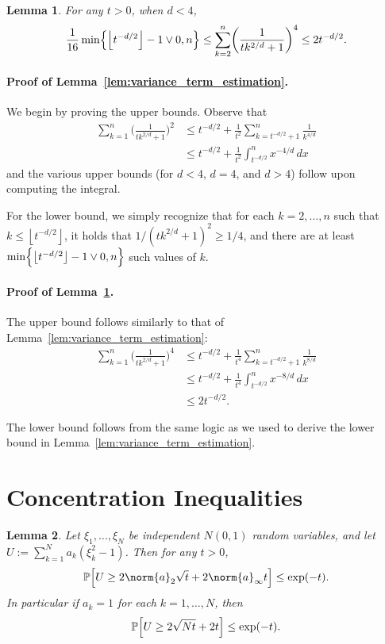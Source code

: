 \documentclass[twoside]{article}
\newcommand{\floor}[1]{\left\lfloor #1 \right\rfloor}
\newcommand{\1}{\mathbf{1}}
\newcommand{\Pbb}{\mathbb{P}}
\newtheorem{lemma}{Lemma}
\theoremstyle{definition}
\theoremstyle{remark}
\begin{document}
\begin{lemma}
	\label{lem:variance_term_testing}
	For any $t > 0$, when $d < 4$,
	\begin{equation*}
	\frac{1}{16}\min\Bigl\{\floor{t^{-d/2}} - 1 \vee 0,n\Bigr\} \leq \sum_{k = 2}^{n} \biggl(\frac{1}{tk^{2/d} + 1}\biggr)^4 \leq 2t^{-d/2}.
	\end{equation*}
\end{lemma}
\paragraph{Proof of Lemma~\ref{lem:variance_term_estimation}.}
We begin by proving the upper bounds. Observe that
\begin{align*}
 \sum_{k = 1}^{n} \biggl(\frac{1}{tk^{2/d} + 1}\biggr)^2 & \leq t^{-d/2} + \frac{1}{t^2}\sum_{k = t^{-d/2} + 1}^{n} \frac{1}{k^{4/d}} \\
 & \leq t^{-d/2} + \frac{1}{t^2} \int_{t^{-d/2}}^{n} x^{-4/d} \,dx
\end{align*}
and the various upper bounds (for $d < 4$, $d = 4$, and $d > 4$) follow upon computing the integral.

For the lower bound, we simply recognize that for each $k = 2,\ldots,n$ such that $k \leq \floor{t^{-d/2}}$, it holds that $1/(tk^{2/d} + 1)^2 \geq 1/4$, and there are at least $\min\Bigl\{\floor{t^{-d/2}} - 1 \vee 0,n\Bigr\}$ such values of $k$.

\paragraph{Proof of Lemma~\ref{lem:variance_term_testing}.}
The upper bound follows similarly to that of Lemma~\ref{lem:variance_term_estimation}:
\begin{align*}
\sum_{k = 1}^{n} \biggl(\frac{1}{tk^{2/d} + 1}\biggr)^4 & \leq t^{-d/2} + \frac{1}{t^4}\sum_{k = t^{-d/2} + 1}^{n} \frac{1}{k^{8/d}} \\
& \leq t^{-d/2} + \frac{1}{t^4} \int_{t^{-d/2}}^{n} x^{-8/d} \,dx \\
& \leq 2t^{-d/2}.
\end{align*}

The lower bound follows from the same logic as we used to derive the lower bound in Lemma~\ref{lem:variance_term_estimation}.

\section{Concentration Inequalities}
\label{sec:concentration}
\begin{lemma}
	\label{lem:chi_square_bound}
	Let $\xi_1,\ldots,\xi_N$ be independent $N(0,1)$ random variables, and let $U := \sum_{k = 1}^{N} a_k(\xi_k^2 - 1)$.  Then for any $t > 0$,
	\begin{equation*}
	\Pbb\Bigl[U \geq 2 \norm{a}_2 \sqrt{t} + 2 \norm{a}_{\infty}t\Bigr] \leq \exp(-t).
	\end{equation*}
	In particular if $a_k = 1$ for each $k = 1,\ldots,N$, then
	\begin{equation*}
	\Pbb\Bigl[U\geq 2\sqrt{N t} + 2t\Bigr] \leq \exp(-t).
	\end{equation*}
\end{lemma}
\end{document}
